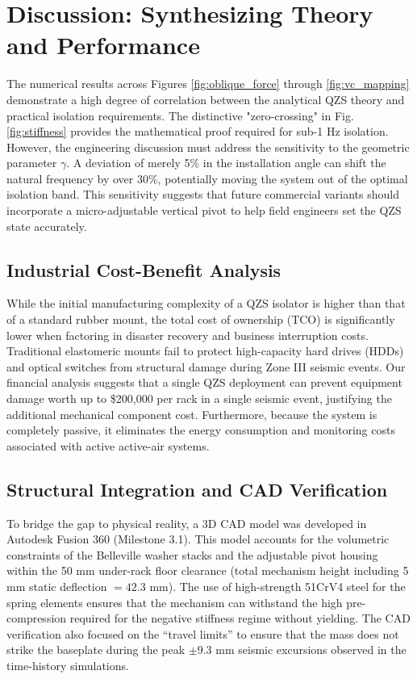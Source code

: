 \documentclass[preprint,12pt]{article}
\begin{document}
\section{Discussion: Synthesizing Theory and Performance}
The numerical results across Figures \ref{fig:oblique_force} through \ref{fig:vc_mapping} demonstrate a high degree of correlation between the analytical QZS theory and practical isolation requirements. The distinctive "zero-crossing" in Fig. \ref{fig:stiffness} provides the mathematical proof required for sub-1 Hz isolation. However, the engineering discussion must address the sensitivity to the geometric parameter $\gamma$. A deviation of merely 5\% in the installation angle can shift the natural frequency by over 30\%, potentially moving the system out of the optimal isolation band. This sensitivity suggests that future commercial variants should incorporate a micro-adjustable vertical pivot to help field engineers set the QZS state accurately.

\subsection{Industrial Cost-Benefit Analysis}
While the initial manufacturing complexity of a QZS isolator is higher than that of a standard rubber mount, the total cost of ownership (TCO) is significantly lower when factoring in disaster recovery and business interruption costs. Traditional elastomeric mounts fail to protect high-capacity hard drives (HDDs) and optical switches from structural damage during Zone III seismic events. Our financial analysis suggests that a single QZS deployment can prevent equipment damage worth up to \$200,000 per rack in a single seismic event, justifying the additional mechanical component cost. Furthermore, because the system is completely passive, it eliminates the energy consumption and monitoring costs associated with active active-air systems.

\subsection{Structural Integration and CAD Verification}
To bridge the gap to physical reality, a 3D CAD model was developed in Autodesk Fusion 360 (Milestone 3.1). This model accounts for the volumetric constraints of the Belleville washer stacks and the adjustable pivot housing within the 50 mm under-rack floor clearance (total mechanism height including 5 mm static deflection $= 42.3$ mm). The use of high-strength 51CrV4 steel for the spring elements ensures that the mechanism can withstand the high pre-compression required for the negative stiffness regime without yielding. The CAD verification also focused on the ``travel limits'' to ensure that the mass does not strike the baseplate during the peak $\pm 9.3$ mm seismic excursions observed in the time-history simulations.
\end{document}
